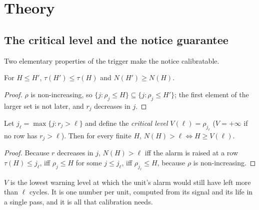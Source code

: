 \section{Theory}\label{sec:theory}

\subsection{The critical level and the notice guarantee}

Two elementary properties of the trigger make the notice calibratable.

\begin{lemma}[Monotonicity]\label{lem:mono}
For $H \le H'$, $\tau(H') \le \tau(H)$ and $N(H') \ge N(H)$.
\end{lemma}
\begin{proof}
$\rho$ is non-increasing, so $\{j:\rho_j\le H\}\subseteq\{j:\rho_j\le H'\}$; the first element of the larger set is not later, and $r_j$ decreases in $j$.
\end{proof}

\begin{lemma}\label{lem:crit}
Let $j_\ell=\max\{j:r_j>\ell\}$ and define the \emph{critical level} $V(\ell)=\rho_{j_\ell}$ ($V=+\infty$ if no row has $r_j>\ell$). Then for every finite $H$, $N(H)>\ell \iff H\ge V(\ell)$.
\end{lemma}
\begin{proof}
Because $r$ decreases in $j$, $N(H)>\ell$ iff the alarm is raised at a row $\tau(H)\le j_\ell$, iff $\rho_j\le H$ for some $j\le j_\ell$, iff $\rho_{j_\ell}\le H$, because $\rho$ is non-increasing.
\end{proof}

$V$ is the lowest warning level at which the unit's alarm would still have left more than $\ell$ cycles. It is one number per unit, computed from its signal and its life in a single pass, and it is all that calibration needs.

